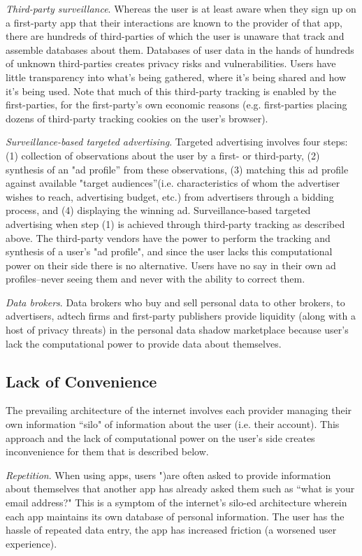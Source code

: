 \documentclass[11pt, oneside]{article}   	%
\begin{document}
\emph{Third-party surveillance}. Whereas the user is at least aware when they sign up on a first-party app that their interactions are known to the provider of that app, there are hundreds of third-parties of which the user is unaware that track and assemble databases about them. Databases of user data in the hands of hundreds of unknown third-parties creates privacy risks and vulnerabilities. Users have little transparency into what's being gathered, where it's being shared and how it's being used. Note that much of this third-party tracking is enabled by the first-parties, for the first-party's own economic reasons (e.g. first-parties placing dozens of third-party tracking cookies on the user's browser).

\emph{Surveillance-based targeted advertising}. Targeted advertising involves four steps: (1) collection of observations about the user by a first- or third-party, (2) synthesis of an "ad profile” from these observations, (3) matching this ad profile against available "target audiences”(i.e. characteristics of whom the advertiser wishes to reach, advertising budget, etc.) from advertisers through a bidding process, and (4) displaying the winning ad. Surveillance-based targeted advertising when step (1) is achieved through third-party tracking as described above. The third-party vendors have the power to perform the tracking and synthesis of a user's "ad profile", and since the user lacks this computational power on their side there is no alternative. Users have no say in their own ad profiles--never seeing them and never with the ability to correct them.

\emph{Data brokers}. Data brokers who buy and sell personal data to other brokers, to advertisers, adtech firms and first-party publishers provide liquidity (along with a host of privacy threats) in the personal data shadow marketplace because user's lack the computational power to provide data about themselves.

\subsection{Lack of Convenience}
The prevailing architecture of the internet involves each provider managing their own  information ``silo" of information about the user (i.e. their account). This approach and the lack of computational power on the user's side creates inconvenience for them that is described below.

\emph{Repetition}. When using apps, users ")are often asked to provide information about themselves that another app has already asked them such as ``what is your email address?" This is a symptom of the internet's silo-ed architecture wherein each app maintains its own database of personal information. The user has the hassle of repeated data entry, the app has increased friction (a worsened user experience).
\end{document}
